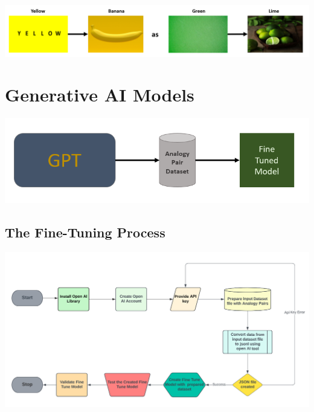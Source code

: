 \documentclass[a0,landscape]{a0poster}
\begin{document}
\begin{multicols}{4}
\begin{center}\vspace{1cm}
\includegraphics[width=0.99\linewidth]{Example1.png}
\end{center}\vspace{1cm}

\color{Black}


\color{Teal}
\section*{Generative AI Models}
\color{Black}


\begin{center}
\includegraphics[width=0.60\linewidth]{Fine-Tune-GPT.png}
\end{center}\vspace{1cm}

\color{Teal}
\subsection*{The Fine-Tuning Process}
\begin{center}
\includegraphics[width=0.99\linewidth]{FlowChart.png}
\end{center}\vspace{1cm}


\end{multicols}
\end{document}
